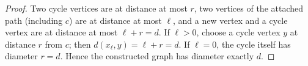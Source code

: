 \documentclass[12pt]{amsart}
\theoremstyle{conjecture}
\theoremstyle{definition}
\theoremstyle{question}
\theoremstyle{theorem}
\begin{document}
\begin{proof}
        Two cycle vertices are at distance at most $r$, two vertices
        of the attached path (including $c$) are at distance at most
        $\ell$, and a new vertex and a cycle vertex are at distance at
        most $\ell+r=d$.  If $\ell>0$, choose a cycle vertex $y$ at
        distance $r$ from $c$; then $d(x_\ell,y)=\ell+r=d$.
        If $\ell=0$, the cycle itself has diameter $r=d$.
        Hence the constructed graph has diameter exactly $d$.
    \end{proof}
\end{document}
